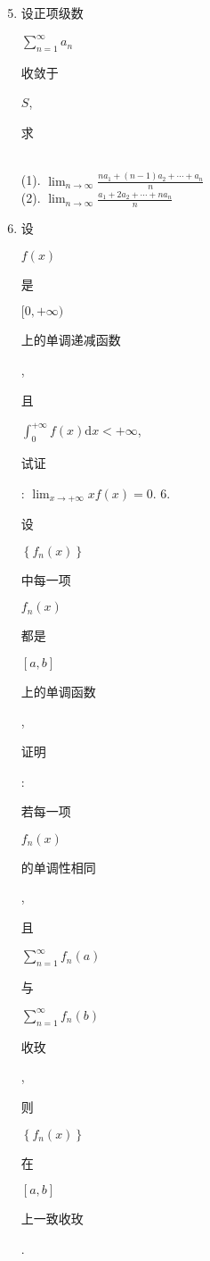 \documentclass[10pt]{article}
\begin{document}
\begin{enumerate}
  \setcounter{enumi}{4}
  \item \begin{CJK}{UTF8}{mj}设正项级数\end{CJK} $\sum_{n=1}^{\infty} a_{n}$ \begin{CJK}{UTF8}{mj}收敛于\end{CJK} $S$, \begin{CJK}{UTF8}{mj}求\end{CJK}\\
(1). $\lim _{n \rightarrow \infty} \frac{n a_{1}+(n-1) a_{2}+\cdots+a_{n}}{n}$\\
(2). $\lim _{n \rightarrow \infty} \frac{a_{1}+2 a_{2}+\cdots+n a_{n}}{n}$

  \item \begin{CJK}{UTF8}{mj}设\end{CJK} $f(x)$ \begin{CJK}{UTF8}{mj}是\end{CJK} $[0,+\infty)$ \begin{CJK}{UTF8}{mj}上的单调递减函数\end{CJK}, \begin{CJK}{UTF8}{mj}且\end{CJK} $\int_{0}^{+\infty} f(x) \mathrm{d} x<+\infty$, \begin{CJK}{UTF8}{mj}试证\end{CJK}: $\lim _{x \rightarrow+\infty} x f(x)=0$. 6. \begin{CJK}{UTF8}{mj}设\end{CJK} $\left\{f_{n}(x)\right\}$ \begin{CJK}{UTF8}{mj}中每一项\end{CJK} $f_{n}(x)$ \begin{CJK}{UTF8}{mj}都是\end{CJK} $[a, b]$ \begin{CJK}{UTF8}{mj}上的单调函数\end{CJK}, \begin{CJK}{UTF8}{mj}证明\end{CJK}: \begin{CJK}{UTF8}{mj}若每一项\end{CJK} $f_{n}(x)$ \begin{CJK}{UTF8}{mj}的单调性相同\end{CJK}, \begin{CJK}{UTF8}{mj}且\end{CJK} $\sum_{n=1}^{\infty} f_{n}(a)$ \begin{CJK}{UTF8}{mj}与\end{CJK} $\sum_{n=1}^{\infty} f_{n}(b)$ \begin{CJK}{UTF8}{mj}收玫\end{CJK}, \begin{CJK}{UTF8}{mj}则\end{CJK} $\left\{f_{n}(x)\right\}$ \begin{CJK}{UTF8}{mj}在\end{CJK} $[a, b]$ \begin{CJK}{UTF8}{mj}上一致收玫\end{CJK}.


\end{enumerate}
\end{document}
